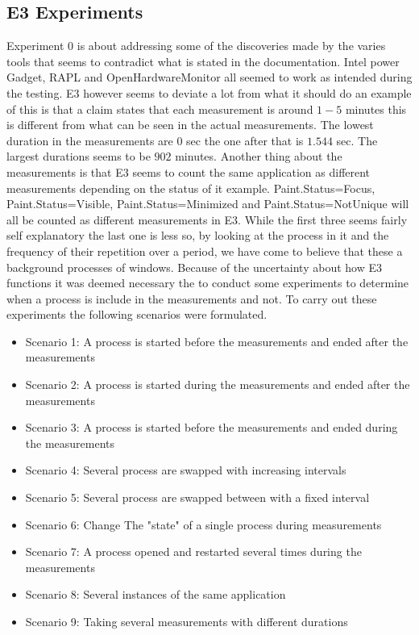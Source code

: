 \subsection{E3 Experiments}
Experiment 0 is about addressing some of the discoveries made by the varies tools that seems to contradict what is stated in the documentation.
Intel power Gadget, RAPL and OpenHardwareMonitor all seemed to work as intended during the testing. E3 however seems to deviate a lot from what it should do an example of this is that a claim states that each measurement is around $1-5$ minutes this is different from what can be seen in the actual measurements. The lowest duration in the measurements are $0$ sec the one after that is $1.544$ sec. The largest durations seems to be $902$ minutes. Another thing about the measurements is that E3 seems to count the same application as different measurements depending on the status of it example. Paint.Status=Focus, Paint.Status=Visible, Paint.Status=Minimized and Paint.Status=NotUnique will all be counted as different measurements in E3. While the first three seems fairly self explanatory the last one is less so, by looking at the process in it and the frequency of their repetition over a period, we have come to believe that these a background processes of windows. 
Because of the uncertainty about how E3 functions it was deemed necessary the to conduct some experiments to determine when a process is include in the measurements and not. To carry out these experiments the following scenarios were formulated.
\begin{itemize}
    \item Scenario 1: A process is started before the measurements and ended after the measurements
    \item Scenario 2: A process is started during the measurements and ended after the measurements
    \item Scenario 3: A process is started before the measurements and ended during the measurements
    \item Scenario 4: Several process are swapped with increasing intervals
    \item Scenario 5: Several process are swapped between with a fixed interval
    \item Scenario 6: Change The "state" of a single process during measurements
    \item Scenario 7: A process opened and restarted several times during the measurements
    \item Scenario 8: Several instances of the same application
    \item Scenario 9: Taking several measurements with different durations
\end{itemize}
